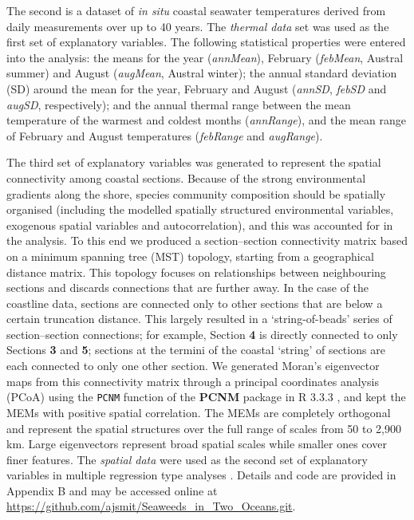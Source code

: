 \documentclass[utf8]{frontiersSCNS} %
\begin{document}
The second is a dataset of \emph{in situ} coastal seawater temperatures \citep{Smit2013} derived from daily measurements over up to 40 years. The \emph{thermal data} set was used as the first set of explanatory variables. The following statistical properties were entered into the analysis: the means for the year (\emph{annMean}), February (\emph{febMean}, Austral summer) and August (\emph{augMean}, Austral winter); the annual standard deviation (SD) around the mean for the year, February and August (\emph{annSD}, \emph{febSD} and \emph{augSD}, respectively); and the annual thermal range between the mean temperature of the warmest and coldest months (\emph{annRange}), and the mean range of February and August temperatures (\emph{febRange} and \emph{augRange}).

The third set of explanatory variables was generated to represent the spatial connectivity among coastal sections. Because of the strong environmental gradients along the shore, species community composition should be spatially organised (including the modelled spatially structured environmental variables, exogenous spatial variables and autocorrelation), and this was accounted for in the analysis. To this end we produced a section--section connectivity matrix based on a minimum spanning tree (MST) topology, starting from a geographical distance matrix. This topology focuses on relationships between neighbouring sections and discards connections that are further away. In the case of the coastline data, sections are connected only to other sections that are below a certain truncation distance. This largely resulted in a `string-of-beads' series of section--section connections; for example, Section \textbf{4} is directly connected to only Sections \textbf{3} and \textbf{5}; sections at the termini of the coastal `string' of sections are each connected to only one other section. We generated Moran's eigenvector maps \citep[MEM;][]{Dray2006,Dray2012a} from this connectivity matrix through a principal coordinates analysis (PCoA) using the \texttt{PCNM} function of the \textbf{PCNM} package in R 3.3.3 \citep{R2017}, and kept the MEMs with positive spatial correlation. The MEMs are completely orthogonal and represent the spatial structures over the full range of scales from 50 to 2,900 km. Large eigenvectors represent broad spatial scales while smaller ones cover finer features. The \emph{spatial data} were used as the second set of explanatory variables in multiple regression type analyses \citep{Dray2012a}. Details and code are provided in Appendix B and may be accessed online at \url{https://github.com/ajsmit/Seaweeds_in_Two_Oceans.git}.
\end{document}
